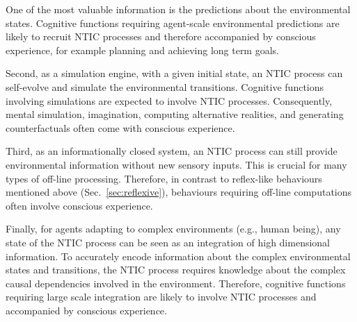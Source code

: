 \documentclass[utf8]{article}
\begin{document}
		    
		    One of the most valuable information is the predictions about the environmental states. Cognitive functions requiring agent-scale environmental predictions are likely to recruit NTIC processes and therefore accompanied by conscious experience, for example planning and achieving long term goals.
		   
            Second, as a simulation engine, with a given initial state, an NTIC process can self-evolve and simulate the environmental transitions. Cognitive functions involving simulations are expected to involve NTIC processes. Consequently, mental simulation, imagination, computing alternative realities, and generating counterfactuals often come with conscious experience. 
            
    	    Third, as an informationally closed system, an NTIC process can still provide environmental information without new sensory inputs. This is crucial for many types of off-line processing. Therefore, in contrast to reflex-like behaviours mentioned above (Sec.~\ref{sec:reflexive}), behaviours requiring off-line computations \citep{milner1999paradoxical, himmelbach2005dorsal,revol2003pointing} often involve conscious experience. 
    	    
    	    Finally, for agents adapting to complex environments (e.g., human being), any state of the NTIC process can be seen as an integration of high dimensional information. To accurately encode information about the complex environmental states and transitions, the NTIC process requires knowledge about the complex causal dependencies involved in the environment. Therefore, cognitive functions requiring large scale integration are likely to involve NTIC processes and accompanied by conscious experience. %
    	    
\end{document}
